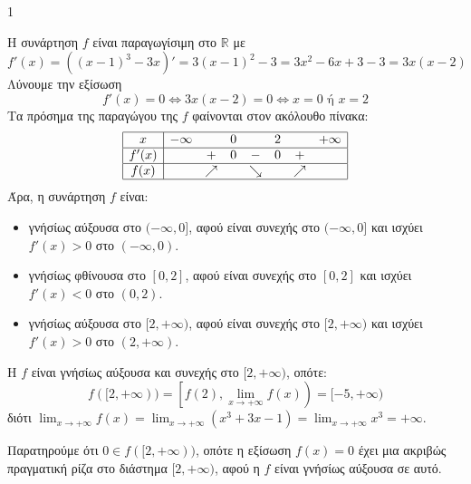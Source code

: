\begin{ylh}{1}
    \item [Ύλη από εικόνα]
\end{ylh}
\begin{alist}
\item Η συνάρτηση $f$ είναι παραγωγίσιμη στο $\mathbb{R}$ με
\[ f'(x) = ((x-1)^3 - 3x)' = 3(x-1)^2 - 3 = 3x^2 - 6x + 3 - 3 = 3x(x-2) \]
Λύνουμε την εξίσωση
\[ f'(x) = 0 \Leftrightarrow 3x(x-2) = 0 \Leftrightarrow x = 0 \text{ ή } x = 2 \]
Τα πρόσημα της παραγώγου της $f$ φαίνονται στον ακόλουθο πίνακα:
\[
\begin{array}{|c|ccccccc|}
\hline
x & -\infty & & 0 & & 2 & & +\infty \\
\hline
f'(x) & & + & 0 & - & 0 & + & \\
\hline
f(x) & & \nearrow & & \searrow & & \nearrow & \\
\hline
\end{array}
\]
Άρα, η συνάρτηση $f$ είναι:
\begin{itemize}
    \item γνήσίως αύξουσα στο $(-\infty,0]$, αφού είναι συνεχής στο $(-\infty,0]$ και ισχύει $f'(x) > 0$ στο $(-\infty,0)$.
    \item γνήσίως φθίνουσα στο $[0,2]$, αφού είναι συνεχής στο $[0,2]$ και ισχύει $f'(x) < 0$ στο $(0,2)$.
    \item γνήσίως αύξουσα στο $[2,+\infty)$, αφού είναι συνεχής στο $[2,+\infty)$ και ισχύει $f'(x) > 0$ στο $(2,+\infty)$.
\end{itemize}
\item Η $f$ είναι γνήσίως αύξουσα και συνεχής στο $[2,+\infty)$, οπότε:
\[ f([2,+\infty)) = \left[f(2), \lim_{x\to+\infty} f(x)\right) = [-5,+\infty) \]
διότι $\lim_{x\to+\infty} f(x) = \lim_{x\to+\infty} (x^3 + 3x - 1) = \lim_{x\to+\infty} x^3 = +\infty$.
\item Παρατηρούμε ότι $0 \in f([2,+\infty))$, οπότε η εξίσωση $f(x) = 0$ έχει μια ακριβώς πραγματική ρίζα στο διάστημα $[2,+\infty)$, αφού η $f$ είναι γνήσίως αύξουσα σε αυτό.
\end{alist}